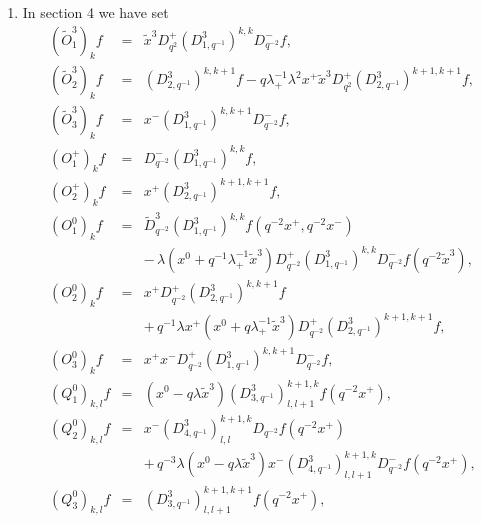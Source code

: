 \documentclass[a4paper,11pt,oneside]{article}
\begin{document}
\begin{enumerate}
\item  In section 4 we have set 
\begin{eqnarray}
\left( \tilde{O}_{1}^{3}\right) _{k}f &=&\tilde{x}^{3}D_{q^{2}}^{+}\left(
D_{1,q^{-1}}^{3}\right) ^{k,k}D_{q^{-2}}^{-}f, \\
\left( \tilde{O}_{2}^{3}\right) _{k}f &=&\left( D_{2,q^{-1}}^{3}\right)
^{k,k+1}f-q\lambda _{+}^{-1}\lambda ^{2}x^{+}\tilde{x}^{3}D_{q^{2}}^{+}%
\left( D_{2,q^{-1}}^{3}\right) ^{k+1,k+1}f,  \nonumber \\
\left( \tilde{O}_{3}^{3}\right) _{k}f &=&x^{-}\left( D_{1,q^{-1}}^{3}\right)
^{k,k+1}D_{q^{-2}}^{-}f,  \nonumber \\[0.16in]
\left( O_{1}^{+}\right) _{k}f &=&D_{q^{-2}}^{-}\left(
D_{1,q^{-1}}^{3}\right) ^{k,k}f, \\
\left( O_{2}^{+}\right) _{k}f &=&x^{+}\left( D_{2,q^{-1}}^{3}\right)
^{k+1,k+1}f,  \nonumber \\[0.16in]
\left( O_{1}^{0}\right) _{k}f &=&\tilde{D}_{q^{-2}}^{3}\left(
D_{1,q^{-1}}^{3}\right) ^{k,k}f\left( q^{-2}x^{+},q^{-2}x^{-}\right) \\
&&-\,\lambda \left( x^{0}+q^{-1}\lambda _{+}^{-1}\tilde{x}^{3}\right)
D_{q^{-2}}^{+}\left( D_{1,q^{-1}}^{3}\right) ^{k,k}D_{q^{-2}}^{-}f\left(
q^{-2}\tilde{x}^{3}\right) ,  \nonumber \\
\left( O_{2}^{0}\right) _{k}f &=&x^{+}D_{q^{-2}}^{+}\left(
D_{2,q^{-1}}^{3}\right) ^{k,k+1}f  \nonumber \\
&&+\,q^{-1}\lambda x^{+}\left( x^{0}+q\lambda _{+}^{-1}\tilde{x}^{3}\right)
D_{q^{-2}}^{+}\left( D_{2,q^{-1}}^{3}\right) ^{k+1,k+1}f,  \nonumber \\
\left( O_{3}^{0}\right) _{k}f &=&x^{+}x^{-}D_{q^{-2}}^{+}\left(
D_{1,q^{-1}}^{3}\right) ^{k,k+1}D_{q^{-2}}^{-}f,  \nonumber \\[0.16in]
\left( Q_{1}^{0}\right) _{k,l}f &=&\left( x^{0}-q\lambda \tilde{x}%
^{3}\right) \left( D_{3,q^{-1}}^{3}\right) _{l,l+1}^{k+1,k}f\left(
q^{-2}x^{+}\right) , \\
\left( Q_{2}^{0}\right) _{k,l}f &=&x^{-}\left( D_{4,q^{-1}}^{3}\right)
_{l,l}^{k+1,k}D_{q^{-2}}f\left( q^{-2}x^{+}\right)  \nonumber \\
&&+\,q^{-3}\lambda \left( x^{0}-q\lambda \tilde{x}^{3}\right) x^{-}\left(
D_{4,q^{-1}}^{3}\right) _{l,l+1}^{k+1,k}D_{q^{-2}}^{-}f\left(
q^{-2}x^{+}\right) ,  \nonumber \\
\left( Q_{3}^{0}\right) _{k,l}f &=&\left( D_{3,q^{-1}}^{3}\right)
_{l,l+1}^{k+1,k+1}f\left( q^{-2}x^{+}\right) ,  \nonumber \\

\end{eqnarray}
\end{enumerate}
\end{document}

